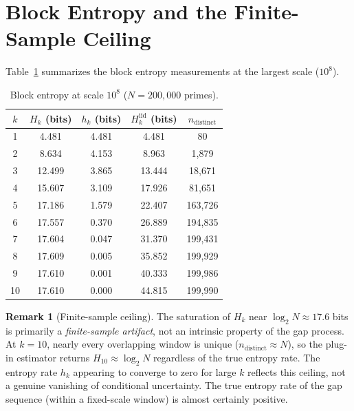 \documentclass[11pt, a4paper]{amsart}
\theoremstyle{plain}
\theoremstyle{definition}
\newtheorem{remark}[theorem]{Remark}
\begin{document}
\section{Block Entropy and the Finite-Sample Ceiling}
\label{sec:block-entropy}

Table~\ref{tab:block-entropy} summarizes the block entropy measurements at the largest scale ($10^8$).

\begin{table}[ht]
\centering
\caption{Block entropy at scale $10^8$ ($N = 200{,}000$ primes).}
\label{tab:block-entropy}
\begin{tabular}{ccccc}
\toprule
$k$ & $H_k$ (bits) & $h_k$ (bits) & $H_k^{\mathrm{iid}}$ (bits) & $n_{\text{distinct}}$ \\
\midrule
1  & 4.481 & 4.481 & 4.481  & 80 \\
2  & 8.634 & 4.153 & 8.963  & 1{,}879 \\
3  & 12.499 & 3.865 & 13.444 & 18{,}671 \\
4  & 15.607 & 3.109 & 17.926 & 81{,}651 \\
5  & 17.186 & 1.579 & 22.407 & 163{,}726 \\
6  & 17.557 & 0.370 & 26.889 & 194{,}835 \\
7  & 17.604 & 0.047 & 31.370 & 199{,}431 \\
8  & 17.609 & 0.005 & 35.852 & 199{,}929 \\
9  & 17.610 & 0.001 & 40.333 & 199{,}986 \\
10 & 17.610 & 0.000 & 44.815 & 199{,}990 \\
\bottomrule
\end{tabular}
\end{table}

\begin{remark}[Finite-sample ceiling]
\label{rem:ceiling}
The saturation of $H_k$ near $\log_2 N \approx 17.6$ bits is primarily a \emph{finite-sample artifact}, not an intrinsic property of the gap process. At $k = 10$, nearly every overlapping window is unique ($n_{\text{distinct}} \approx N$), so the plug-in estimator returns $H_{10} \approx \log_2 N$ regardless of the true entropy rate.
The entropy rate $h_k$ appearing to converge to zero for large $k$ reflects this ceiling, not a genuine vanishing of conditional uncertainty.
The true entropy rate of the gap sequence (within a fixed-scale window) is almost certainly positive.
\end{remark}
\end{document}
